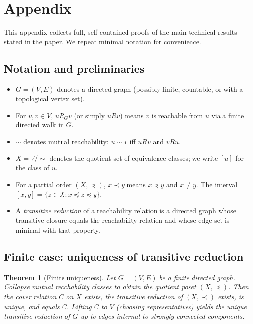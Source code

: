 \documentclass[11pt]{article}
\newtheorem{theorem}[definition]{Theorem}
\begin{document}
\section{Appendix}
This appendix collects full, self‑contained proofs of the main technical
results stated in the paper. We repeat minimal notation for convenience.

\subsection*{Notation and preliminaries}

\begin{itemize}
  \item $G=(V,E)$ denotes a directed graph (possibly finite, countable, or
    with a topological vertex set).
  \item For $u,v\in V$, $uR_G v$ (or simply $uR v$) means $v$ is reachable
    from $u$ via a finite directed walk in $G$.
  \item $\sim$ denotes mutual reachability: $u\sim v$ iff $uR v$ and $vR u$.
  \item $X=V/\!\sim$ denotes the quotient set of equivalence classes; we
    write $[u]$ for the class of $u$.
  \item For a partial order $(X,\preceq)$, $x\prec y$ means $x\preceq y$ and
    $x\neq y$. The interval $[x,y]=\{z\in X: x\preceq z\preceq y\}$.
  \item A \emph{transitive reduction} of a reachability relation is a
    directed graph whose transitive closure equals the reachability
    relation and whose edge set is minimal with that property.
\end{itemize}

\subsection*{Finite case: uniqueness of transitive reduction}
\begin{theorem}[Finite uniqueness]
Let $G=(V,E)$ be a finite directed graph. Collapse mutual reachability
classes to obtain the quotient poset $(X,\preceq)$. Then the cover relation
$C$ on $X$ exists, the transitive reduction of $(X,\prec)$ exists, is
unique, and equals $C$. Lifting $C$ to $V$ (choosing representatives)
yields the unique transitive reduction of $G$ up to edges internal to
strongly connected components.
\end{theorem}
\end{document}
